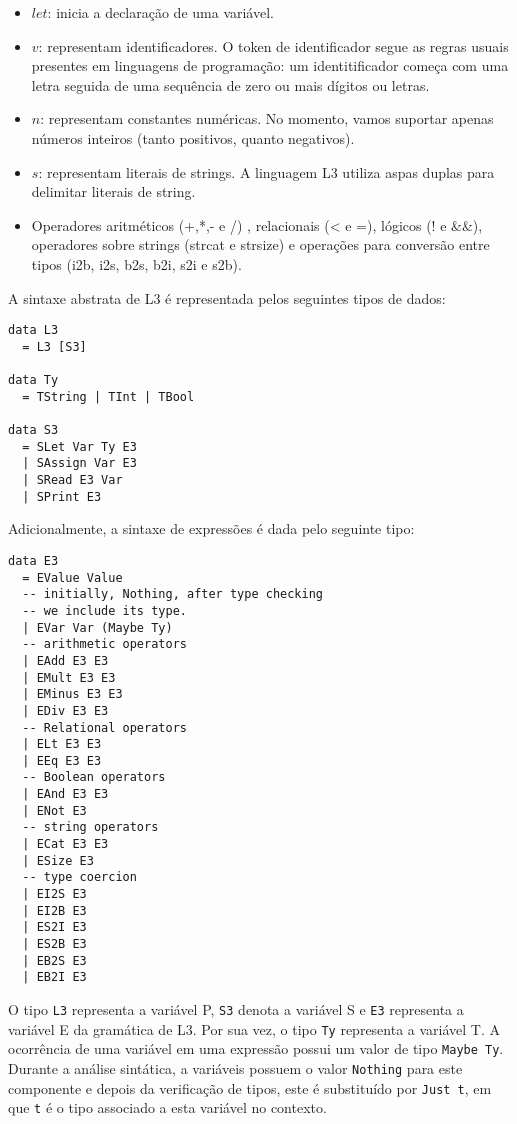\documentclass[a4paper,11pt]{article}
\begin{document}
\begin{itemize}
\item \(let\): inicia a declaração de uma variável.

\item \(v\): representam identificadores. O token de identificador segue as regras usuais
presentes em linguagens de programação: um identitificador começa com uma letra
seguida de uma sequência de zero ou mais dígitos ou letras.

\item \(n\): representam constantes numéricas. No momento, vamos suportar apenas números
inteiros (tanto positivos, quanto negativos).

\item \(s\): representam literais de strings. A linguagem L3 utiliza aspas duplas para
delimitar literais de string.
\item Operadores aritméticos (+,*,- e /) , relacionais (< e =), lógicos (! e \&\&),
operadores sobre strings (strcat e strsize) e operações para conversão entre tipos
(i2b, i2s, b2s, b2i, s2i e s2b).
\end{itemize}

A sintaxe abstrata de L3 é representada pelos seguintes tipos de dados:

\begin{verbatim}
data L3
  = L3 [S3]

data Ty
  = TString | TInt | TBool

data S3
  = SLet Var Ty E3
  | SAssign Var E3
  | SRead E3 Var
  | SPrint E3
\end{verbatim}

Adicionalmente, a sintaxe de expressões é dada pelo seguinte tipo:

\begin{verbatim}
data E3
  = EValue Value
  -- initially, Nothing, after type checking
  -- we include its type.
  | EVar Var (Maybe Ty)
  -- arithmetic operators
  | EAdd E3 E3
  | EMult E3 E3
  | EMinus E3 E3
  | EDiv E3 E3
  -- Relational operators
  | ELt E3 E3
  | EEq E3 E3
  -- Boolean operators
  | EAnd E3 E3
  | ENot E3
  -- string operators
  | ECat E3 E3
  | ESize E3
  -- type coercion
  | EI2S E3
  | EI2B E3
  | ES2I E3
  | ES2B E3
  | EB2S E3
  | EB2I E3
\end{verbatim}

O tipo \texttt{L3} representa a variável P, \texttt{S3} denota a variável S e \texttt{E3} representa a
variável E da gramática de L3. Por sua vez, o tipo \texttt{Ty} representa a variável T.
A ocorrência de uma variável em uma expressão possui um valor de tipo \texttt{Maybe Ty}.
Durante a análise sintática, a variáveis possuem o valor \texttt{Nothing} para este componente e
depois da verificação de tipos, este é substituído por \texttt{Just t}, em que \texttt{t} é o tipo
associado a esta variável no contexto.
\end{document}

